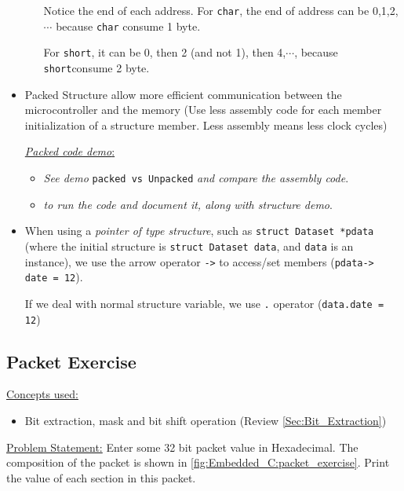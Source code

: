 \begin{itemize}
\begin{itemize}
Notice the end of each address. For \verb|char|, the end of address can be 0,1,2,$\cdots$ because \verb|char| consume 1 byte.

For \verb|short|, it can be 0, then 2 (and not 1), then 4,$\cdots$, because \verb|short|consume 2 byte.

    \end{itemize}
    

\item Packed Structure allow more efficient communication between the microcontroller and the memory (Use less assembly code for each member initialization of a structure member. Less assembly means less clock cycles)

 \underline{ \textit{Packed code demo}:} 

\begin{itemize}
    \item \textit{See demo} \verb|packed vs Unpacked| \textit{and compare the assembly code}.

    \item \textit{to run the code and document it, along with structure demo}.
    
\end{itemize}

\item When using a \textit{pointer of type structure}, such as \verb|struct Dataset *pdata| (where the initial structure is \verb|struct Dataset data|, and \verb|data| is an instance), we use the arrow operator \verb|->| to access/set members (\verb|pdata-> date = 12|).

If we deal with normal structure variable, we use \verb|.| operator (\verb|data.date = 12|)

\end{itemize}

\newpage
\subsection{Packet Exercise}
\label{Sub:Packet_Exercise}

\underline{Concepts used:}

\begin{itemize}
    \item Bit extraction, mask and bit shift operation (Review \autoref{Sec:Bit_Extraction})
\end{itemize}

\underline{Problem Statement:} Enter some 32 bit packet value in Hexadecimal. The composition of the packet is shown in \autoref{fig:Embedded_C:packet_exercise}. Print the value of each section in this packet.


